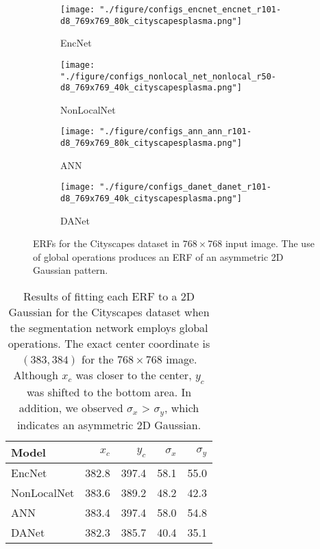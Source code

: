 \documentclass{article}
\begin{document}
\begin{figure}[t!]
	\centering
	\begin{subfigure}[b]{0.241\linewidth}
		\centering
		\texttt{[image: "./figure/configs\_encnet\_encnet\_r101-d8\_769x769\_80k\_cityscapesplasma.png"]}
		\caption{EncNet \citep{DBLP:conf/cvpr/0005DSZWTA18}}
	\end{subfigure}
	\hfill
	\begin{subfigure}[b]{0.241\linewidth}
		\centering
		\texttt{[image: "./figure/configs\_nonlocal\_net\_nonlocal\_r50-d8\_769x769\_40k\_cityscapesplasma.png"]}
		\caption{NonLocalNet \citep{DBLP:conf/cvpr/0004GGH18}}
	\end{subfigure}
	\hfill
	\begin{subfigure}[b]{0.241\linewidth}
		\centering
		\texttt{[image: "./figure/configs\_ann\_ann\_r101-d8\_769x769\_80k\_cityscapesplasma.png"]}
		\caption{ANN \citep{DBLP:conf/iccv/ZhuXBHB19}}
	\end{subfigure}
	\hfill
	\begin{subfigure}[b]{0.241\linewidth}
		\centering
		\texttt{[image: "./figure/configs\_danet\_danet\_r101-d8\_769x769\_40k\_cityscapesplasma.png"]}
		\caption{DANet \citep{DBLP:conf/cvpr/FuLT0BFL19}}
	\end{subfigure}
	\caption{ERFs for the Cityscapes dataset in $768 \times 768$ input image. The use of global operations produces an ERF of an asymmetric 2D Gaussian pattern.}
	\label{fig:asy}
\end{figure}

\begin{table}[t!]
	\caption{Results of fitting each ERF to a 2D Gaussian for the Cityscapes dataset when the segmentation network employs global operations. The exact center coordinate is $(383, 384)$ for the $768 \times 768$ image. Although $x_c$ was closer to the center, $y_c$ was shifted to the bottom area. In addition, we observed $\sigma_x$ > $\sigma_y$, which indicates an asymmetric 2D Gaussian.}
	\label{tab:asy}
	\centering
	\begin{tabular}{l|rrrr}
		\toprule
		Model                                        & $x_c$ & $y_c$ & $\sigma_x$ & $\sigma_y$ \\
		\midrule
		EncNet \citep{DBLP:conf/cvpr/0005DSZWTA18}   & 382.8 & 397.4 & 58.1       & 55.0       \\
		NonLocalNet \citep{DBLP:conf/cvpr/0004GGH18} & 383.6 & 389.2 & 48.2       & 42.3       \\
		ANN \citep{DBLP:conf/iccv/ZhuXBHB19}         & 383.4 & 397.4 & 58.0       & 54.8       \\
		DANet \citep{DBLP:conf/cvpr/FuLT0BFL19}      & 382.3 & 385.7 & 40.4       & 35.1       \\
		\bottomrule
	\end{tabular}
\end{table}
\end{document}
